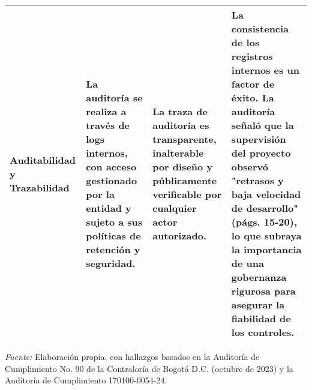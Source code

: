 \begin{table}[htbp]
\begin{tabular}{p{3.5cm} p{5.5cm} p{5.5cm} p{3.5cm}}
        \textbf{Auditabilidad y Trazabilidad} & La auditoría se realiza a través de logs internos, con acceso gestionado por la entidad y sujeto a sus políticas de retención y seguridad. & La traza de auditoría es transparente, inalterable por diseño y públicamente verificable por cualquier actor autorizado. & La consistencia de los registros internos es un factor de éxito. La auditoría señaló que la supervisión del proyecto observó "retrasos y baja velocidad de desarrollo" (págs. 15-20), lo que subraya la importancia de una gobernanza rigurosa para asegurar la fiabilidad de los controles. \\
        \bottomrule
    \end{tabular}
    \vspace{2em}
    \begin{flushleft}
        \textit{Fuente:} Elaboración propia, con hallazgos basados en la Auditoría de Cumplimiento No. 90 de la Contraloría de Bogotá D.C. (octubre de 2023) y la Auditoría de Cumplimiento 170100-0054-24.
    \end{flushleft}
    \label{tab:comparacion_modelos}
\end{table}

